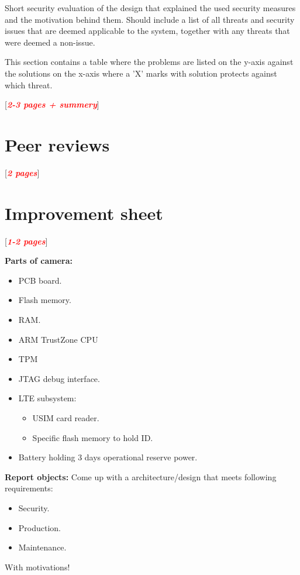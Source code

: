 \documentclass[10pt]{article}
\newcommand{\comm}[1]{{\leavevmode\color{gray}#1}}
\newcommand{\todo}[1]{
  \begin{center}
    [\textcolor{red}{\textbf{\textit{#1}}}]
  \end{center}
}
\begin{document}
  \comm{%
    Short security evaluation of the design that explained the used security
    measures and the motivation behind them. Should include a list of all
    threats and security issues that are deemed applicable to the system,
    together with any threats that were deemed a non-issue.

    This section contains a table where the problems are listed on the y-axis
    against the solutions on the x-axis where a 'X' marks with solution
    protects against which threat.
  }

    \todo{2-3 pages + summery}

    

  \section{Peer reviews}
    \todo{2 pages}

  \section{Improvement sheet}
    \todo{1-2 pages}

  \newpage

  \textbf{Parts of camera:}
  \begin{itemize}
    \item{PCB board.}
    \item{Flash memory.}
    \item{RAM.}
    \item{ARM TrustZone CPU}
    \item{TPM}
    \item{JTAG debug interface.}
    \item{LTE subsystem:}
    \begin{itemize}
      \item{USIM card reader.}
      \item{Specific flash memory to hold ID.}
    \end{itemize}
    \item{Battery holding 3 days operational reserve power.}
  \end{itemize}

  \textbf{Report objects:}
  Come up with a architecture/design that meets following requirements:
  \begin{itemize}
    \item{Security.}
    \item{Production.}
    \item{Maintenance.}
  \end{itemize}
  With motivations!
\end{document}
